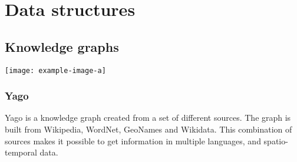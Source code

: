 
\chapter{Data structures}

\section{Knowledge graphs}


\texttt{[image: example-image-a]}

\subsection{Yago}
Yago\cite{yago} is a knowledge graph created from a set of different sources. The graph is built from Wikipedia, WordNet, GeoNames and Wikidata. This combination of sources makes it possible to get information in multiple languages, and spatio-temporal data.

\cleardoublepage